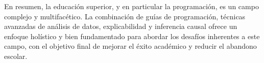 En resumen, la educación superior, y en particular la programación, es un campo complejo y multifacético. La combinación de guías de programación, técnicas avanzadas de análisis de datos, explicabilidad y inferencia causal ofrece un enfoque holístico y bien fundamentado para abordar los desafíos inherentes a este campo, con el objetivo final de mejorar el éxito académico y reducir el abandono escolar.